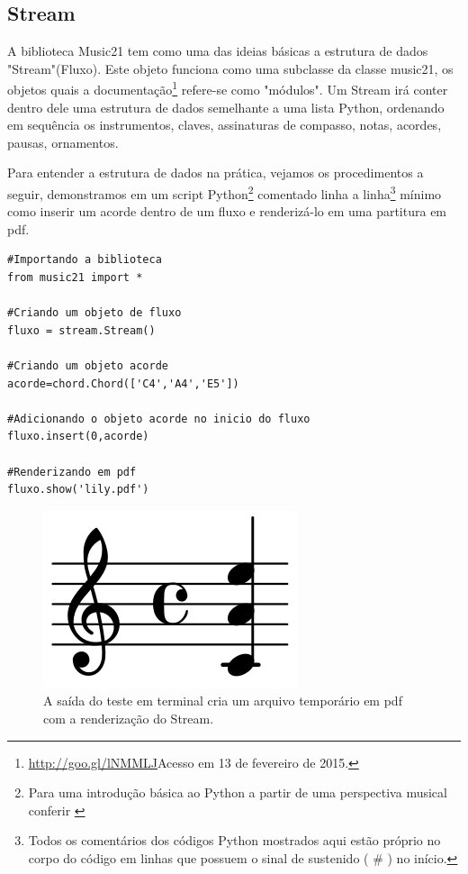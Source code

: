\documentclass[
	12pt,				%
	openright,			%
	twoside,			%
	a4paper,			%
	english,			%
	french,				%
	spanish,			%
	brazil				%
	]{abntex2}
\begin{document}
\subsection{Stream}

A biblioteca Music21 tem como uma das ideias básicas a estrutura de dados "Stream"(Fluxo). Este objeto funciona como uma subclasse da classe music21, os objetos quais a documentação\footnote{\url{http://goo.gl/lNMMLJ}Acesso em 13 de fevereiro de 2015.} refere-se  como "módulos". Um Stream irá conter dentro dele uma estrutura de dados semelhante a uma lista Python, ordenando em sequência os instrumentos, claves, assinaturas de compasso, notas, acordes, pausas, ornamentos.

Para entender a estrutura de dados na prática, vejamos os procedimentos a seguir, demonstramos em um script Python\footnote{Para uma introdução básica ao Python a partir de uma perspectiva musical conferir \cite{Kroger201208} } comentado linha a linha\footnote{Todos os comentários dos códigos Python mostrados aqui estão próprio no corpo do código em linhas que possuem o sinal de sustenido ( \# ) no início.} mínimo como inserir um acorde dentro de um fluxo e renderizá-lo em uma partitura em pdf.

 
\begin{lstlisting}
#Importando a biblioteca
from music21 import *

#Criando um objeto de fluxo 
fluxo = stream.Stream()

#Criando um objeto acorde
acorde=chord.Chord(['C4','A4','E5'])

#Adicionando o objeto acorde no inicio do fluxo
fluxo.insert(0,acorde)

#Renderizando em pdf
fluxo.show('lily.pdf')
\end{lstlisting}
 

\begin{figure}[!h]
	\caption{\label{fig_grafico} A saída do teste em terminal cria um arquivo temporário em pdf com a renderização do Stream.}
	\begin{center}
	    \includegraphics[scale=0.3]{estudosM21/acorde01.png}
	\end{center}
\end{figure}
\end{document}
